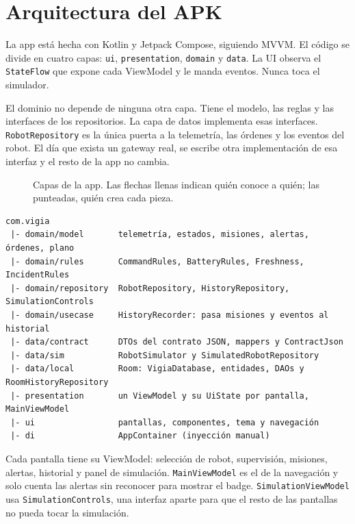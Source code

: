 \section{Arquitectura del APK}
\label{sec:arquitectura}

La app está hecha con Kotlin y Jetpack Compose, siguiendo MVVM. El código se divide en cuatro capas: \texttt{ui}, \texttt{presentation}, \texttt{domain} y \texttt{data}. La UI observa el \texttt{StateFlow} que expone cada ViewModel y le manda eventos. Nunca toca el simulador.

El dominio no depende de ninguna otra capa. Tiene el modelo, las reglas y las interfaces de los repositorios. La capa de datos implementa esas interfaces. \texttt{RobotRepository} es la única puerta a la telemetría, las órdenes y los eventos del robot. El día que exista un gateway real, se escribe otra implementación de esa interfaz y el resto de la app no cambia.

\begin{figure}[H]
\centering

\caption{Capas de la app. Las flechas llenas indican quién conoce a quién; las punteadas, quién crea cada pieza.}
\label{fig:arquitectura}
\end{figure}

\begin{lstlisting}
com.vigia
 |- domain/model       telemetría, estados, misiones, alertas, órdenes, plano
 |- domain/rules       CommandRules, BatteryRules, Freshness, IncidentRules
 |- domain/repository  RobotRepository, HistoryRepository, SimulationControls
 |- domain/usecase     HistoryRecorder: pasa misiones y eventos al historial
 |- data/contract      DTOs del contrato JSON, mappers y ContractJson
 |- data/sim           RobotSimulator y SimulatedRobotRepository
 |- data/local         Room: VigiaDatabase, entidades, DAOs y RoomHistoryRepository
 |- presentation       un ViewModel y su UiState por pantalla, MainViewModel
 |- ui                 pantallas, componentes, tema y navegación
 |- di                 AppContainer (inyección manual)
\end{lstlisting}

Cada pantalla tiene su ViewModel: selección de robot, supervisión, misiones, alertas, historial y panel de simulación. \texttt{MainViewModel} es el de la navegación y solo cuenta las alertas sin reconocer para mostrar el badge. \texttt{SimulationViewModel} usa \texttt{SimulationControls}, una interfaz aparte para que el resto de las pantallas no pueda tocar la simulación.

